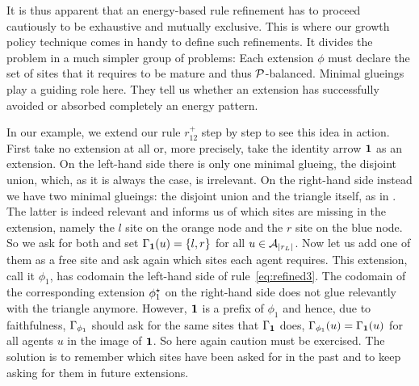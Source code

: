 It is thus apparent that
an energy-based rule refinement has to proceed
cautiously to be exhaustive and mutually exclusive. %
This is where our growth policy technique
comes in handy to define such refinements.
It divides the problem in a much simpler group of problems:
Each extension $\phi$ must declare the set of sites
that it requires to be mature and thus $\mathcal{P}$-balanced.
Minimal glueings play a guiding role here.
They tell us whether an extension has successfully
avoided or absorbed completely an energy pattern.

In our example, we extend our rule $r^+_{12}$
step by step to see this idea in action.
First take no extension at all or,
more precisely, take the identity arrow $\boldsymbol{\mathbf{1}}$ as an extension.
On the left-hand side there is only one minimal glueing,
the disjoint union, which, as it is always the case,
is irrelevant.
On the right-hand side instead we have two minimal glueings:
the disjoint union and the triangle itself,
as in .
The latter is indeed relevant and informs us
of which sites are missing in the extension,
namely the $l$ site on the orange node
and the $r$ site on the blue node.
So we ask for both and set $\Gamma_{\boldsymbol{\mathbf{1}}}(u) = \left\{ l,r \right\}$
for all $u \in \mathcal{A}_{\left|r_L\right|}$.
Now let us add one of them as a free site
and ask again which sites each agent requires.
This extension, call it $\phi_1$, has codomain
the left-hand side of rule~\ref{eq:refined3}.
The codomain of the corresponding extension $\phi_1^\star$
on the right-hand side
does not glue relevantly with the triangle anymore.
However, $\boldsymbol{\mathbf{1}}$ is a prefix of $\phi_1$
and hence, due to faithfulness,
$\Gamma_{\phi_1}$ should ask for the same sites
that $\Gamma_{\boldsymbol{\mathbf{1}}}$ does,
\ie $\Gamma_{\phi_1}(u) = \Gamma_{\boldsymbol{\mathbf{1}}}(u)$
for all agents $u$ in the image of $\boldsymbol{\mathbf{1}}$. %
So here again caution must be exercised.
The solution is to remember which sites have been asked for
in the past and to keep asking for them in future extensions.

